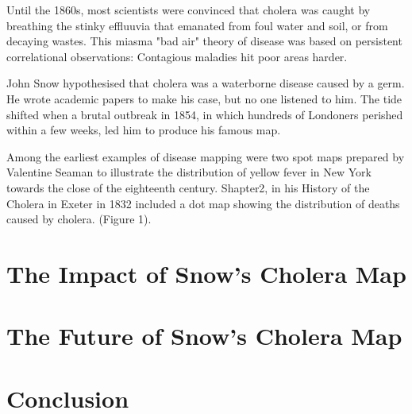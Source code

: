 \documentclass[12pt]{article}
\begin{document}
Until the 1860s, most scientists were convinced that cholera was caught by breathing the stinky effluuvia that emanated from foul water and soil, or from decaying wastes. This miasma "bad air" theory of disease was based on persistent correlational observations: Contagious maladies hit poor areas harder. 

John Snow hypothesised that cholera was a waterborne disease caused by a germ. He wrote academic papers to make his case, but no one listened to him. The tide shifted when a brutal outbreak in 1854, in which hundreds of Londoners perished within a few weeks, led him to produce his famous map. 


Among the earliest examples of disease mapping were
two spot maps prepared by Valentine Seaman to illustrate
the distribution of yellow fever in New York
towards the close of the eighteenth century. Shapter2, in
his History of the Cholera in Exeter in 1832 included a dot
map showing the distribution of deaths caused by
cholera. (Figure 1). \cite{howe1970some}



\section{The Impact of Snow's Cholera Map}

\section{The Future of Snow's Cholera Map}

\section{Conclusion}

% 
% 




\end{document}
